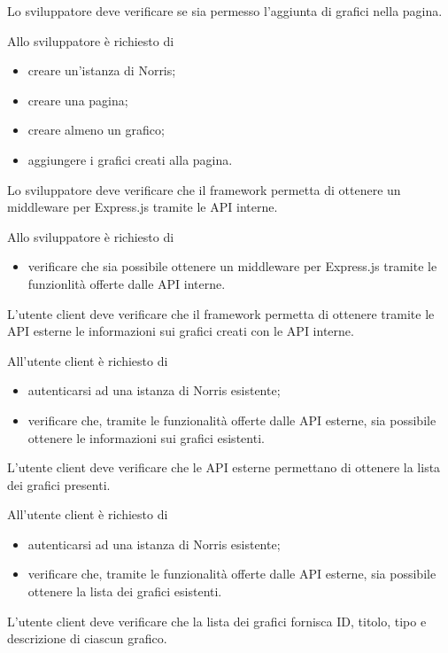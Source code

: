 	Lo sviluppatore deve verificare se sia permesso l'aggiunta di grafici nella pagina.
		
		Allo sviluppatore è richiesto di
		\begin{itemize}
			\item creare un'istanza di Norris;
			\item creare una pagina;
			\item creare almeno un grafico;
			\item aggiungere i grafici creati alla pagina.
		\end{itemize}

	Lo sviluppatore deve verificare che il framework permetta di ottenere un middleware per Express.js tramite le API interne.
		
		Allo sviluppatore è richiesto di
		\begin{itemize}
			\item verificare che sia possibile ottenere un middleware per Express.js tramite le funzionlità offerte dalle API interne.
		\end{itemize}

	L'utente client deve verificare che il framework permetta di ottenere tramite le API esterne le informazioni sui grafici creati con le API interne.

		All'utente client è richiesto di
		\begin{itemize}
			\item autenticarsi ad una istanza di Norris esistente;
			\item verificare che, tramite le funzionalità offerte dalle API esterne, sia possibile ottenere le informazioni sui grafici esistenti.
		\end{itemize}

	L'utente client deve verificare che le API esterne permettano di ottenere la lista dei grafici presenti.

		All'utente client è richiesto di
		\begin{itemize}
			\item autenticarsi ad una istanza di Norris esistente;
			\item verificare che, tramite le funzionalità offerte dalle API esterne, sia possibile ottenere la lista dei grafici esistenti.
		\end{itemize}

	L'utente client deve verificare che la lista dei grafici fornisca ID, titolo, tipo e descrizione di ciascun grafico.
		

